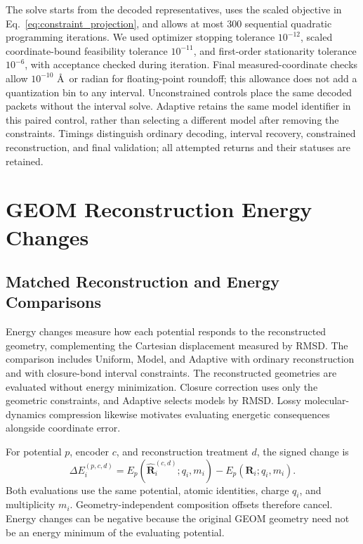 \documentclass[%
 preprint,
superscriptaddress,
 amsmath,amssymb,
 aip,
 jcp,
]{revtex4-2}
\begin{document}
The solve starts from the decoded representatives, uses the scaled objective in Eq.~\ref{eq:constraint_projection}, and allows at most 300 sequential quadratic programming iterations.
We used optimizer stopping tolerance $10^{-12}$, scaled coordinate-bound feasibility tolerance $10^{-11}$, and first-order stationarity tolerance $10^{-6}$, with acceptance checked during iteration.
Final measured-coordinate checks allow $10^{-10}$ \AA\ or radian for floating-point roundoff; this allowance does not add a quantization bin to any interval.
Unconstrained controls place the same decoded packets without the interval solve.
Adaptive retains the same model identifier in this paired control, rather than selecting a different model after removing the constraints.
Timings distinguish ordinary decoding, interval recovery, constrained reconstruction, and final validation; all attempted returns and their statuses are retained.

\section{GEOM Reconstruction Energy Changes}
\label{sec:geom_energy_methods}

\subsection{Matched Reconstruction and Energy Comparisons}

Energy changes measure how each potential responds to the reconstructed geometry, complementing the Cartesian displacement measured by RMSD.
The comparison includes Uniform, Model, and Adaptive with ordinary reconstruction and with closure-bond interval constraints.
The reconstructed geometries are evaluated without energy minimization.
Closure correction uses only the geometric constraints, and Adaptive selects models by RMSD.
Lossy molecular-dynamics compression likewise motivates evaluating energetic consequences alongside coordinate error.\cite{Roe2022:compression-energy}

For potential $p$, encoder $c$, and reconstruction treatment $d$, the signed change is
\begin{equation}
 \Delta E_i^{(p,c,d)}=E_p(\widehat{\mathbf R}_i^{(c,d)};q_i,m_i)
                    -E_p(\mathbf R_i;q_i,m_i).
 \label{eq:geom_energy_change}
\end{equation}
Both evaluations use the same potential, atomic identities, charge $q_i$, and multiplicity $m_i$.
Geometry-independent composition offsets therefore cancel.
Energy changes can be negative because the original GEOM geometry need not be an energy minimum of the evaluating potential.
\end{document}
